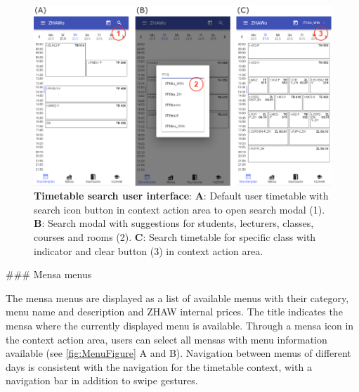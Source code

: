 \begin{markdown}
\begin{figure}[H]
  \includegraphics[width=16cm, center]{./figures/timetable_figure2.png}
  \captionsetup{width=15.5cm}
  \caption[Timetable search user interface]{\textbf{Timetable search user interface}: \textbf{A}: Default user timetable with search icon button in context action area to open search modal (1). \textbf{B}: Search modal with suggestions for students, lecturers, classes, courses and rooms (2). \textbf{C}: Search timetable for specific class with indicator and clear button (3) in context action area.}
  \label{fig:TimetableFigure2}
\end{figure}

### Mensa menus

The mensa menus are displayed as a list of available menus with their category, menu name and description and ZHAW internal prices. The title indicates the mensa where the currently displayed menu is available. Through a mensa icon in the context action area, users can select all mensas with menu information available (see \ref{fig:MenuFigure} A and B). Navigation between menus of different days is consistent with the navigation for the timetable context, with a navigation bar in addition to swipe gestures.


\end{markdown}
